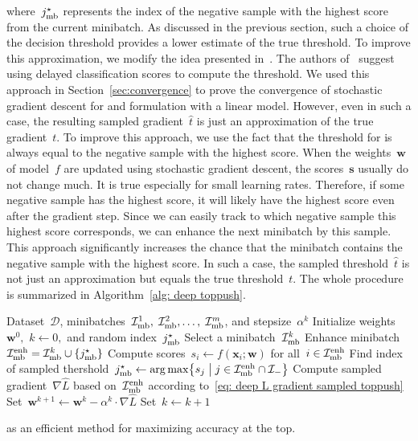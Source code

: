 where~$j^{\star}_{\text{mb}}$ represents the index of the negative sample with the highest score from the current minibatch. As discussed in the previous section, such a choice of the decision threshold provides a lower estimate of the true threshold. To improve this approximation, we modify the idea presented in~\cite{adam2019machine}. The authors of~\cite{adam2019machine} suggest using delayed classification scores to compute the threshold. We used this approach in Section~\ref{sec:convergence} to prove the convergence of stochastic gradient descent for \PatMat and \PatMatNP formulation with a linear model. However, even in such a case, the resulting sampled gradient~$\hat{t}$ is just an approximation of the true gradient~$t.$ To improve this approach, we use the fact that the threshold for \TopPush is always equal to the negative sample with  the highest score. When the weights~$\bm{w}$ of model~$f$ are updated using stochastic gradient descent, the scores~$\bm{s}$ usually do not change much. It is true especially for small learning rates. Therefore, if some negative sample has the highest score, it will likely have the highest score even after the gradient step. Since we can easily track to which negative sample this highest score corresponds, we can enhance the next minibatch by this sample. This approach significantly increases the chance that the minibatch contains the negative sample with the highest score. In such a case, the sampled threshold~$\hat{t}$ is not just an approximation but equals the true threshold~$t.$ The whole procedure is summarized in Algorithm~\ref{alg: deep toppush}.

\pagebreak

\begin{algorithm}
  \centering
  \begin{algorithmic}[1]
    \Require Dataset~$\mathcal{D}$, minibatches~$\mathcal{I}_{\text{mb}}^1,\; \mathcal{I}_{\text{mb}}^2, \ldots, \; \mathcal{I}_{\text{mb}}^m$, and stepsize~$\alpha^k$
    \State Initialize weights~$\bm{w}^0,$ $k \gets 0,$ and random index~$j^{\star}_{\text{mb}}$
    \Repeat
    \State Select a minibatch~$\mathcal{I}_{\text{mb}}^k$
    \State Enhance minibatch~$\Imb^{\text{enh}} = \Imb^k \cup \Brac[c]{\indmaxmb}$
    \State Compute scores~$s_i \gets f(\bm{x}_i; \bm{w})$ for all~$i \in \mathcal{I}_{\text{mb}}^{\text{enh}}$
    \State Find index of sampled thershold~$\indmaxmb \gets \argmax \Set{s_j}{j \in \Imb^{\text{enh}} \cap \Ineg}$
    \State Compute sampled gradient~$\nabla \hat{L}$ based on~$\mathcal{I}_{\text{mb}}^{\text{enh}}$ according to~\eqref{eq: deep L gradient sampled toppush}
    \State Set~$\bm{w}^{k+1} \gets \bm{w}^k - \alpha^k \cdot \nabla \hat{L}$
    \State Set~$k \gets k + 1$
  \end{algorithmic}
  \caption{\DeepTopPush as an efficient method for maximizing accuracy at the top.}
  \label{alg: deep toppush}
\end{algorithm}

